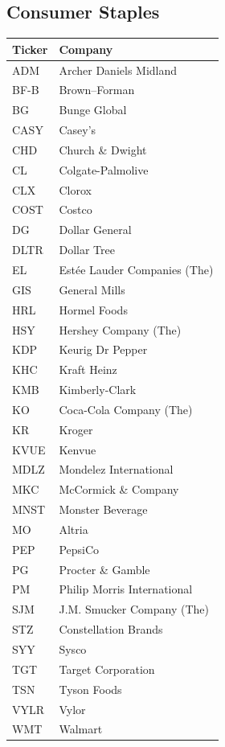 \documentclass[11pt,a4paper]{article}
\begin{document}
\subsection{Consumer Staples}
\begin{table}[H]
\centering
\small
\begin{tabular}{lp{11cm}}
\hline
Ticker & Company \\
\hline
ADM & Archer Daniels Midland \\
BF-B & Brown–Forman \\
BG & Bunge Global \\
CASY & Casey's \\
CHD & Church \& Dwight \\
CL & Colgate-Palmolive \\
CLX & Clorox \\
COST & Costco \\
DG & Dollar General \\
DLTR & Dollar Tree \\
EL & Estée Lauder Companies (The) \\
GIS & General Mills \\
HRL & Hormel Foods \\
HSY & Hershey Company (The) \\
KDP & Keurig Dr Pepper \\
KHC & Kraft Heinz \\
KMB & Kimberly-Clark \\
KO & Coca-Cola Company (The) \\
KR & Kroger \\
KVUE & Kenvue \\
MDLZ & Mondelez International \\
MKC & McCormick \& Company \\
MNST & Monster Beverage \\
MO & Altria \\
PEP & PepsiCo \\
PG & Procter \& Gamble \\
PM & Philip Morris International \\
SJM & J.M. Smucker Company (The) \\
STZ & Constellation Brands \\
SYY & Sysco \\
TGT & Target Corporation \\
TSN & Tyson Foods \\
VYLR & Vylor \\
WMT & Walmart \\
\hline
\end{tabular}
\end{table}
\end{document}
